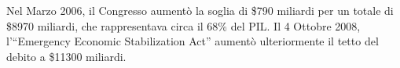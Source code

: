 \documentclass{article}
\begin{document}

Nel Marzo 2006, il Congresso aument\`o la soglia di
\$790 miliardi per un totale di \$8970 miliardi,
che rappresentava circa il 68\% del PIL. Il 4 Ottobre
2008, l'``Emergency Economic Stabilization
Act'' aument\`o ulteriormente il tetto del debito
a \$11300 miliardi.
\end{document}
